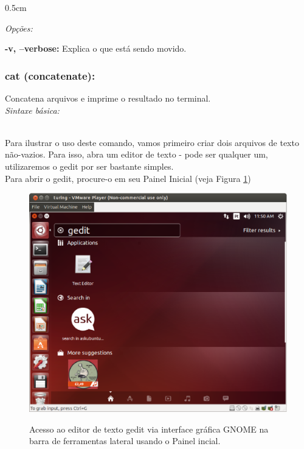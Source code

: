 \begin{refsection}
\begin {myindentpar}{0.5cm}
\begin{enumerate}[\itshape i.]
\end{enumerate}
\end{myindentpar}

\textit{Opções:}

 \textbf{-v, --verbose:} Explica o que está sendo movido.\\

\subsubsection{cat (concatenate):}\label{tut1:text_mode:commands:cat}

 Concatena arquivos e imprime o resultado no terminal.\\

\textit{Sintaxe básica:}

 \\
Para ilustrar o uso deste comando, vamos primeiro criar dois arquivos de texto não-vazios. Para isso, abra um editor de texto - pode ser qualquer um, utilizaremos o gedit por ser bastante simples.\\
 Para abrir o gedit, procure-o em seu Painel Inicial (veja Figura \ref{tut1:fig:gedit})

  \begin{figure}[H]
      {\includegraphics[scale=0.35]{figures/tut1/gedit.eps}}
      {\caption[\textit{Acesso ao gedit via interface gráfica GNOME usando o Painel incial}]{Acesso ao editor de texto gedit via interface gráfica GNOME na barra de ferramentas lateral  usando o Painel incial.}\label{tut1:fig:gedit}}
  \end{figure}


\end{refsection}
